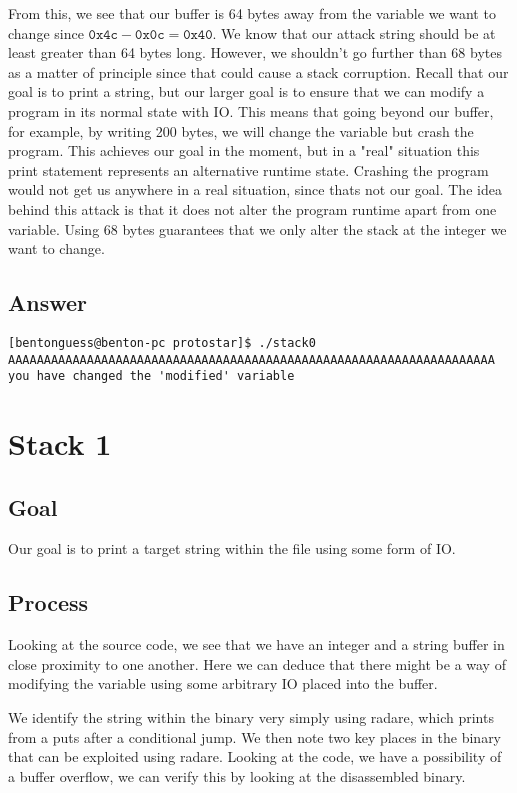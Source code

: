 \documentclass[11pt]{article}
\begin{document}
From this, we see that our buffer is 64 bytes away from the variable we want to change since $\texttt{0x4c} - \texttt{0x0c} = \texttt{0x40}$. We know that our attack string should be at least greater than 64 bytes long. However, we shouldn't go further than 68 bytes as a matter of principle since that could cause a stack corruption. Recall that our goal is to print a string, but our larger goal is to ensure that we can modify a program in its normal state with IO. This means that going beyond our buffer, for example, by writing 200 bytes, we will change the variable but crash the program. This achieves our goal in the moment, but in a "real" situation this print statement represents an alternative runtime state. Crashing the program would not get us anywhere in a real situation, since thats not our goal. The idea behind this attack is that it does not alter the program runtime apart from one variable. Using 68 bytes guarantees that we only alter the stack at the integer we want to change.

\subsection*{Answer}
\begin{lstlisting}
[bentonguess@benton-pc protostar]$ ./stack0
AAAAAAAAAAAAAAAAAAAAAAAAAAAAAAAAAAAAAAAAAAAAAAAAAAAAAAAAAAAAAAAAAAAA            
you have changed the 'modified' variable
\end{lstlisting}

\section*{Stack 1}
\subsection*{Goal}
Our goal is to print a target string within the file using some form of IO. 

\subsection*{Process}
Looking at the source code, we see that we have an integer and a string buffer in close proximity to one another. Here we can deduce that there might be a way of modifying the variable using some arbitrary IO placed into the buffer.

We identify the string within the binary very simply using radare, which prints from a puts after a conditional jump. We then note two key places in the binary that can be exploited using radare. Looking at the code, we have a possibility of a buffer overflow, we can verify this by looking at the disassembled binary.
\end{document}
